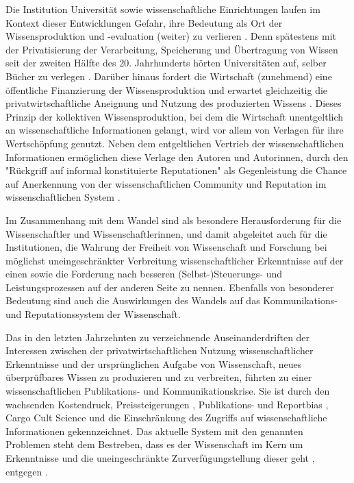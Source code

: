 Die Institution Universität sowie wissenschaftliche Einrichtungen laufen im Kontext dieser Entwicklungen Gefahr, ihre Bedeutung als Ort der Wissensproduktion und -evaluation (weiter) zu verlieren \cite[:343]{Kruecken_2001}. Denn spätestens mit der Privatisierung der Verarbeitung, Speicherung und Übertragung von Wissen seit der zweiten Hälfte des 20. Jahrhunderts hörten Universitäten auf, selber Bücher zu verlegen \cite{Joseph_2006}. Darüber hinaus fordert die Wirtschaft (zunehmend) eine öffentliche Finanzierung der Wissensproduktion und erwartet gleichzeitig die privatwirtschaftliche Aneignung und Nutzung des produzierten Wissens \cite{Weingart_2001}. Dieses Prinzip der kollektiven Wissensproduktion, bei dem die Wirtschaft unentgeltlich an wissenschaftliche Informationen gelangt, wird vor allem von Verlagen für ihre Wertschöpfung genutzt. Neben dem entgeltlichen Vertrieb der wissenschaftlichen Informationen ermöglichen diese Verlage den Autoren und Autorinnen, durch den "Rückgriff auf informal konstituierte Reputationen" \cite[:237]{Luhmann_1970} als Gegenleistung die Chance auf Anerkennung von der wissenschaftlichen Community und Reputation im wissenschaftlichen System \cite{Bernius_2009}.

Im Zusammenhang mit dem Wandel sind als besondere Herausforderung für die Wissenschaftler und Wissenschaftlerinnen, und damit abgeleitet auch für die Institutionen, die Wahrung der Freiheit von Wissenschaft und Forschung bei möglichst uneingeschränkter Verbreitung wissenschaftlicher Erkenntnisse \cite{Hagner_2015} \cite{BBAW_2015} \cite{Buss_2001} auf der einen sowie die Forderung nach besseren (Selbst-)Steuerungs- und Leistungsprozessen \cite{Adler_2009} \cite{Gibbons_1994} auf der anderen Seite zu nennen. Ebenfalls von besonderer Bedeutung sind auch die Auswirkungen des Wandels auf das Kommunikations- und Reputationssystem der Wissenschaft.

Das in den letzten Jahrzehnten zu verzeichnende Auseinanderdriften der Interessen zwischen der privatwirtschaftlichen Nutzung wissenschaftlicher Erkenntnisse und der ursprünglichen Aufgabe von Wissenschaft, neues überprüfbares Wissen zu produzieren und zu verbreiten, führten zu einer wissenschaftlichen Publikations- und Kommunikationskrise. Sie ist durch den wachsenden Kostendruck, Preissteigerungen \cite{Lewis_2011}, Publikations- \cite{Egger_1997} \cite{Fanelli_2012} \cite{Beverungen_2012} \cite{Brembs_2013} und Reportbias \cite{Chan_2008} \cite{Dickersin_2011}, Cargo Cult Science \cite{Feynman_1974} und die Einschränkung des Zugriffs auf wissenschaftliche Informationen \cite{Hess_2006} gekennzeichnet. Das aktuelle System mit den genannten Problemen steht dem Bestreben, dass es der Wissenschaft im Kern um Erkenntnisse und die uneingeschränkte Zurverfügungstellung dieser geht \cite{Hanekop_2006}, entgegen \cite{Offhaus_2012}.

